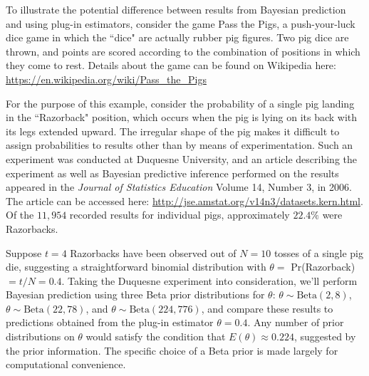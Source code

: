 \documentclass[12pt, a4paper]{article}
\begin{document}



  To illustrate the potential difference between results from Bayesian prediction and using plug-in estimators, consider the game Pass the Pigs\texttrademark, a push-your-luck dice game in which the ``dice" are actually rubber pig figures.  Two pig dice are thrown, and points are scored according to the combination of positions in which they come to rest.  Details about the game can be found on Wikipedia here: \url{https://en.wikipedia.org/wiki/Pass_the_Pigs}

  For the purpose of this example, consider the probability of a single pig landing in the ``Razorback" position, which occurs when the pig is lying on its back with its legs extended upward.  The irregular shape of the pig makes it difficult to assign probabilities to results other than by means of experimentation.  Such an experiment was conducted at Duquesne University, and an article describing the experiment as well as Bayesian predictive inference performed on the results appeared in the \textit{Journal of Statistics Education} Volume 14, Number 3, in 2006.  The article can be accessed here:  \url{http://jse.amstat.org/v14n3/datasets.kern.html}. Of the $11,954$ recorded results for individual pigs, approximately $22.4\%$ were Razorbacks.

  Suppose $t=4$ Razorbacks have been observed out of $N=10$ tosses of a single pig die, suggesting a straightforward binomial distribution with $\theta =$ Pr(Razorback) $= t/N = 0.4$. Taking the Duquesne experiment into consideration, we'll perform Bayesian prediction using three Beta prior distributions for $\theta$: $\theta\sim\text{Beta}(2,8)$, $\theta\sim\text{Beta}(22,78)$, and $\theta\sim\text{Beta}(224,776)$, and compare these results to predictions obtained from the plug-in estimator $\theta = 0.4$.   Any number of prior distributions on $\theta$ would satisfy the condition that $E(\theta) \approx 0.224$, suggested by the prior information.  The specific choice of a Beta prior is made largely for computational convenience.
\end{document}
